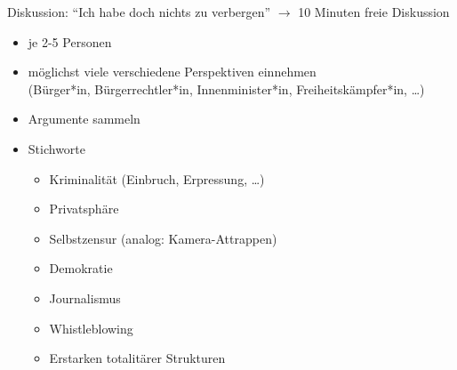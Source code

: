 \documentclass{beamer}
\begin{document}
\begin{frame}[label=d1]{Diskussion: "`Ich habe doch nichts zu verbergen"'}
  $\rightarrow$ 10 Minuten freie Diskussion
  
  \begin{itemize}
   \item  je 2-5 Personen
   \item möglichst viele verschiedene Perspektiven einnehmen\\
  (Bürger*in, Bürgerrechtler*in, Innenminister*in, Freiheitskämpfer*in, …)
   \item Argumente sammeln

   \pause

   \item Stichworte
    \begin{itemize}
     \item Kriminalität (Einbruch, Erpressung, …)
     \item Privatsphäre
     \item Selbstzensur (analog: Kamera-Attrappen)
     \item Demokratie
     \item Journalismus
     \item Whistleblowing
     \item Erstarken totalitärer Strukturen
    \end{itemize}
  \end{itemize}

  
\end{frame}

\end{document}
